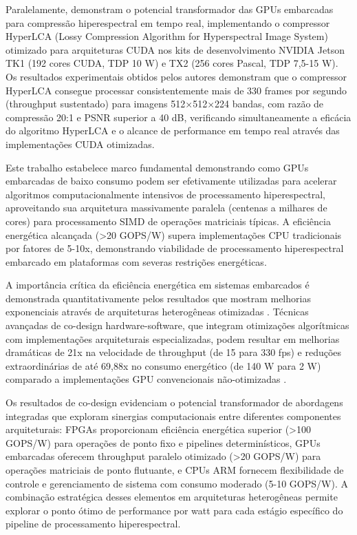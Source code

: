 Paralelamente, \textcite{Diaz2019} demonstram o potencial transformador das 
GPUs embarcadas para compressão hiperespectral em tempo real, implementando 
o compressor HyperLCA (Lossy Compression Algorithm for Hyperspectral Image 
System) otimizado para arquiteturas CUDA nos kits de desenvolvimento NVIDIA 
Jetson TK1 (192 cores CUDA, TDP 10 W) e TX2 (256 cores Pascal, TDP 7,5-15 W). 
Os resultados experimentais obtidos pelos autores demonstram que o compressor 
HyperLCA consegue processar consistentemente mais de 330 frames por segundo 
(throughput sustentado) para imagens 512×512×224 bandas, com razão de compressão 
20:1 e PSNR superior a 40 dB, verificando simultaneamente a eficácia do 
algoritmo HyperLCA e o alcance de performance em tempo real através das 
implementações CUDA otimizadas.

Este trabalho estabelece marco fundamental demonstrando como GPUs embarcadas 
de baixo consumo podem ser efetivamente utilizadas para acelerar algoritmos 
computacionalmente intensivos de processamento hiperespectral, aproveitando 
sua arquitetura massivamente paralela (centenas a milhares de cores) para 
processamento SIMD de operações matriciais típicas. A eficiência energética 
alcançada (>20 GOPS/W) supera implementações CPU tradicionais por fatores 
de 5-10x, demonstrando viabilidade de processamento hiperespectral embarcado 
em plataformas com severas restrições energéticas.

A importância crítica da eficiência energética em sistemas embarcados é 
demonstrada quantitativamente pelos resultados que mostram melhorias 
exponenciais através de arquiteturas heterogêneas otimizadas 
\cite{Vaithianathan2025}. Técnicas avançadas de co-design hardware-software, 
que integram otimizações algorítmicas com implementações arquiteturais 
especializadas, podem resultar em melhorias dramáticas de 21x na velocidade 
de throughput (de 15 para 330 fps) \cite{Hwang2011} e reduções extraordinárias 
de até 69,88x no consumo energético (de 140 W para 2 W) comparado a 
implementações GPU convencionais não-otimizadas \cite{ArucuIliev2025}.

Os resultados de co-design evidenciam o potencial transformador de abordagens 
integradas que exploram sinergias computacionais entre diferentes componentes 
arquiteturais: FPGAs proporcionam eficiência energética superior (>100 GOPS/W) 
para operações de ponto fixo e pipelines determinísticos, GPUs embarcadas 
oferecem throughput paralelo otimizado (>20 GOPS/W) para operações matriciais 
de ponto flutuante, e CPUs ARM fornecem flexibilidade de controle e 
gerenciamento de sistema com consumo moderado (5-10 GOPS/W). A combinação 
estratégica desses elementos em arquiteturas heterogêneas permite explorar 
o ponto ótimo de performance por watt para cada estágio específico do 
pipeline de processamento hiperespectral.

